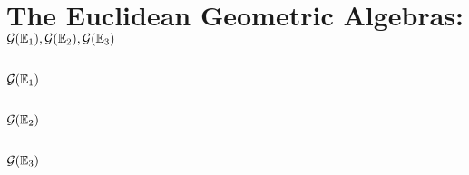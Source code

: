 \section{The Euclidean Geometric Algebras: $\G(\E_1), \G(\E_2), \G(\E_3)$ }

\subsection{$\G(\E_1)$}

\subsection{$\G(\E_2)$}

\subsection{$\G(\E_3)$}

